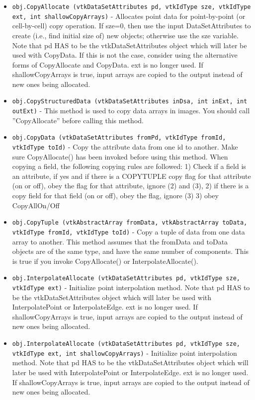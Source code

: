 \begin{itemize}
\item  \verb|obj.CopyAllocate (vtkDataSetAttributes pd, vtkIdType sze, vtkIdType ext, int shallowCopyArrays)| -  Allocates point data for point-by-point (or cell-by-cell) copy operation.
 If sze=0, then use the input DataSetAttributes to create (i.e., find 
 initial size of) new objects; otherwise use the sze variable.
 Note that pd HAS to be the vtkDataSetAttributes object which
 will later be used with CopyData. If this is not the case,
 consider using the alternative forms of CopyAllocate and CopyData.
 ext is no longer used.
 If shallowCopyArrays is true, input arrays are copied to the output
 instead of new ones being allocated.

\item  \verb|obj.CopyStructuredData (vtkDataSetAttributes inDsa, int inExt, int outExt)| -  This method is used to copy data arrays in images.
 You should call ''CopyAllocate'' before calling this method.

\item  \verb|obj.CopyData (vtkDataSetAttributes fromPd, vtkIdType fromId, vtkIdType toId)| -  Copy the attribute data from one id to another. Make sure CopyAllocate()
 has been invoked before using this method. When copying a field,  
 the following copying rules are 
 followed: 1) Check if a field is an attribute, if yes and if there
 is a COPYTUPLE copy flag for that attribute (on or off), obey the  flag 
 for that attribute, ignore (2) and (3), 2) if there is a copy field for
 that field (on or off), obey the flag, ignore (3) 3) obey
 CopyAllOn/Off

\item  \verb|obj.CopyTuple (vtkAbstractArray fromData, vtkAbstractArray toData, vtkIdType fromId, vtkIdType toId)| -  Copy a tuple of data from one data array to another. This method
 assumes that the fromData and toData objects are of the
 same type, and have the same number of components. This is true if you
 invoke CopyAllocate() or InterpolateAllocate().

\item  \verb|obj.InterpolateAllocate (vtkDataSetAttributes pd, vtkIdType sze, vtkIdType ext)| -  Initialize point interpolation method.
 Note that pd HAS to be the vtkDataSetAttributes object which
 will later be used with InterpolatePoint or InterpolateEdge.
 ext is no longer used.
 If shallowCopyArrays is true, input arrays are copied to the output
 instead of new ones being allocated.

\item  \verb|obj.InterpolateAllocate (vtkDataSetAttributes pd, vtkIdType sze, vtkIdType ext, int shallowCopyArrays)| -  Initialize point interpolation method.
 Note that pd HAS to be the vtkDataSetAttributes object which
 will later be used with InterpolatePoint or InterpolateEdge.
 ext is no longer used.
 If shallowCopyArrays is true, input arrays are copied to the output
 instead of new ones being allocated.


\end{itemize}
